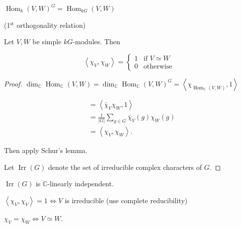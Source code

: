 \documentclass[11pt, a4paper]{report}
\begin{document}
\begin{lemma}
$\operatorname{Hom}_{k}(V, W)^{G}=\operatorname{Hom}_{k G}(V, W)$

\end{lemma}

\begin{theorem}
(1${}^{\text{st}}$ orthogonality relation)

Let $V, W$ be simple $k G$-modules. Then

\[
\left\langle \chi_{V}, \chi_{W}\right\rangle= \begin{cases}1 & \text{if } V \simeq W \\ 0 & \text{otherwise}\end{cases}
\]

\end{theorem}

\begin{proof}
$\operatorname{dim}_{\mathbb{C}} \operatorname{Hom}_{\mathbb{C}}(V, W)=\operatorname{dim}_{\mathbb{C}} \operatorname{Hom}_{\mathbb{C}}(V, W)^{G}=\left\langle \chi_{\operatorname{Hom}_{\mathbb{C}}(V, W)}, 1\right\rangle$

\[
\begin{aligned}
& =\left\langle\bar{\chi}_{V} \chi_{W}, 1\right\rangle \\
& =\frac{1}{|G|} \sum_{g \in G} \bar{\chi}_{V}(g) \chi_{W}(g) \\
& =\left\langle \chi_{V}, \chi_{W}\right\rangle .
\end{aligned}
\]

Then apply Schur's lemma.

Let $\operatorname{Irr}(G)$ denote the set of irreducible complex characters of $G$.
\end{proof}

\begin{corollary}
$\operatorname{Irr}(G)$ is $\mathbb{C}$-linearly independent.

\end{corollary}

\begin{corollary}
$\left\langle \chi_{V}, \chi_{V}\right\rangle=1 \Leftrightarrow V$ is irreducible (use complete reducibility)

\end{corollary}

\begin{corollary}
$\chi_{V}=\chi_{W} \Leftrightarrow V \simeq W$.

\end{corollary}
\end{document}
